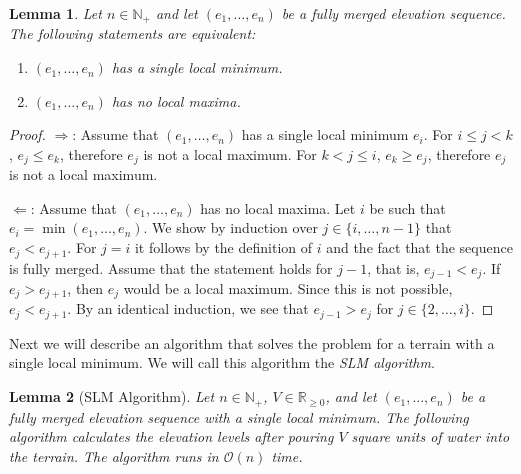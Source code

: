 \documentclass[11pt,a4paper]{article}
\newtheorem{lem}{Lemma}
\newcommand{\Np}{\mathbb{N}_+}
\newcommand{\bO}{\mathcal{O}}
\newcommand{\Rnn}{\mathbb{R}_{\ge0}}
\begin{document}
\begin{lem}
  \label{localmin}
  Let $n\in\Np$ and let $(e_1,\ldots,e_n)$ be a fully merged elevation sequence.
  The following statements are equivalent:
  \begin{enumerate}
    \item $(e_1,\ldots,e_n)$ has a single local minimum.
    \item $(e_1,\ldots,e_n)$ has no local maxima.
  \end{enumerate}
\end{lem}

\begin{proof}
  $\Rightarrow$: Assume that $(e_1,\ldots,e_n)$ has a single local minimum $e_i$.
  For $i \le j < k$, $e_j \le e_k$, therefore $e_j$ is not a local maximum.
  For $k < j \le i$, $e_k \ge e_j$, therefore $e_j$ is not a local maximum.

  $\Leftarrow$: Assume that $(e_1,\ldots,e_n)$ has no local maxima.
  Let $i$ be such that $e_i = \min(e_1,\ldots,e_n)$.
  We show by induction over $j \in \{i,\ldots,n-1\}$ that $e_j < e_{j+1}$.
  For $j = i$ it follows by the definition of $i$ and the fact that the sequence is fully merged.
  Assume that the statement holds for $j-1$, that is, $e_{j-1} < e_j$.
  If $e_j > e_{j+1}$, then $e_j$ would be a local maximum.
  Since this is not possible, $e_j < e_{j+1}$.
  By an identical induction, we see that $e_{j-1} > e_j$ for $j \in \{2,\ldots,i\}$.
\end{proof}

Next we will describe an algorithm that solves the problem for a terrain with a single local minimum.
We will call this algorithm the \textit{SLM algorithm}.

\begin{lem}[SLM Algorithm]
    Let $n\in\Np$, $V\in\Rnn$, and let $(e_1,\ldots,e_n)$ be a fully merged elevation sequence with a single local minimum.
    The following algorithm calculates the elevation levels after pouring $V$ square units of water into the terrain.
    The algorithm runs in $\bO(n)$ time.
\end{lem}

\vspace{1em}
\end{document}
